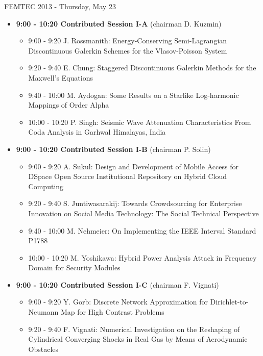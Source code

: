 \documentclass[10pt, A4]{article}%
\begin{document}
\newpage
\newpage

\centerline{\huge FEMTEC 2013 - Thursday, May 23}
\vspace{4mm}

\begin{itemize}    
\item {\bf 9:00 - 10:20 Contributed Session I-A} (chairman D. Kuzmin) 
  \begin{itemize}
    \item 9:00 - 9:20 {J. Rossmanith}: {Energy-Conserving Semi-Lagrangian Discontinuous Galerkin Schemes for the Vlasov-Poisson System} %
    \item 9:20 - 9:40 {E. Chung}: {Staggered Discontinuous Galerkin Methods for the Maxwell's Equations}   
    \item 9:40 - 10:00 {M. Aydogan}: {Some  Results on a Starlike  Log-harmonic Mappings of Order Alpha} %
    \item 10:00 - 10:20  {P. Singh}: {Seismic Wave Attenuation Characteristics  From Coda Analysis in Garhwal Himalayas, India} %
  \end{itemize}
  \item {\bf 9:00 - 10:20 Contributed Session I-B} (chairman P. Solin) 
  \begin{itemize}
    \item 9:00 - 9:20 {A. Sukul}: {Design and Development of Mobile Access for DSpace Open Source Institutional Repository on Hybrid Cloud Computing} %
    \item 9:20 - 9:40 {S. Juntiwasarakij}: {Towards Crowdsourcing for Enterprise Innovation on Social Media Technology: The Social Technical Perspective} %
    \item 9:40 - 10:00 {M. Nehmeier}: {On Implementing  the IEEE Interval Standard P1788}
    \item 10:00 - 10:20 {M. Yoshikawa}: {Hybrid Power Analysis Attack in Frequency Domain for Security Modules}
  \end{itemize}
    \item {\bf 9:00 - 10:20 Contributed Session I-C} (chairman F. Vignati) 
  \begin{itemize}
    \item 9:00 - 9:20 {Y. Gorb}: {Discrete Network Approximation for Dirichlet-to-Neumann Map for High Contrast Problems} %
    \item 9:20 - 9:40 {F. Vignati}: {Numerical Investigation on the Reshaping of Cylindrical Converging Shocks in Real Gas by Means of Aerodynamic Obstacles}

\end{itemize}
\end{itemize}
\end{document}
